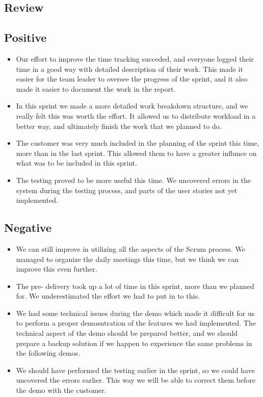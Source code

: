 \subsection{Review}

\subsection{Positive}

\begin{itemize}
\item Our effort to improve the time tracking succeded, and everyone logged their time in a good way with detailed description of their work. This made it easier for the team leader to oversee the progress of the sprint, and it also made it easier to document the work in the report.
\item In this sprint we made a more detailed work breakdown structure, and we really felt this was worth the effort. It allowed us to distribute workload in a better way, and ultimately finish the work that we planned to do.
\item The customer was very much included in the planning of the sprint this time, more than in the last sprint. This allowed them to have a greater influnce on what was to be included in this sprint.
\item The testing proved to be more useful this time. We uncovered errors in the system during the testing process, and parts of the user stories not yet implemented.
\end{itemize}

\subsection{Negative}

\begin{itemize}
\item We can still improve in utilizing all the aspects of the Scrum process. We managed to organize the daily meetings this time, but we think we can improve this even further.
\item The pre- delivery took up a lot of time in this sprint, more than we planned for. We underestimated the effort we had to put in to this.
\item We had some technical issues during the demo which made it difficult for us to perform a proper demosntration of the features we had implemented. The technical aspect of the demo should be prepared better, and we should prepare a backup solution if we happen to experience the same problems in the following demos.
\item We should have performed the testing earlier in the sprint, so we could have uncovered the errors earlier. This way we will be able to correct them before the demo with the customer.
\end{itemize}

